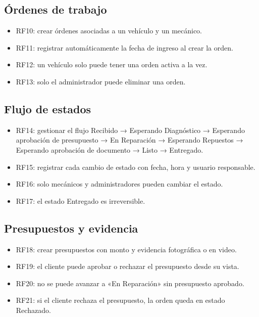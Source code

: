 \documentclass[11pt]{article}
\begin{document}
\subsection{Órdenes de trabajo}
\begin{itemize}
  \item RF10: crear órdenes asociadas a un vehículo y un mecánico.
  \item RF11: registrar automáticamente la fecha de ingreso al crear la orden.
  \item RF12: un vehículo solo puede tener una orden activa a la vez.
  \item RF13: solo el administrador puede eliminar una orden.
\end{itemize}

\subsection{Flujo de estados}
\begin{itemize}
  \item RF14: gestionar el flujo Recibido → Esperando Diagnóstico → Esperando aprobación de presupuesto → En Reparación → Esperando Repuestos → Esperando aprobación de documento → Listo → Entregado.
  \item RF15: registrar cada cambio de estado con fecha, hora y usuario responsable.
  \item RF16: solo mecánicos y administradores pueden cambiar el estado.
  \item RF17: el estado Entregado es irreversible.
\end{itemize}

\subsection{Presupuestos y evidencia}
\begin{itemize}
  \item RF18: crear presupuestos con monto y evidencia fotográfica o en video.
  \item RF19: el cliente puede aprobar o rechazar el presupuesto desde su vista.
  \item RF20: no se puede avanzar a «En Reparación» sin presupuesto aprobado.
  \item RF21: si el cliente rechaza el presupuesto, la orden queda en estado Rechazado.
\end{itemize}
\end{document}
